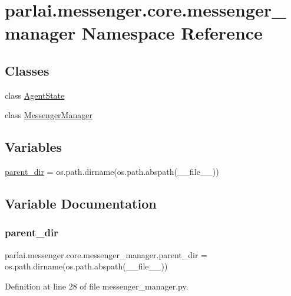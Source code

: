 \hypertarget{namespaceparlai_1_1messenger_1_1core_1_1messenger__manager}{}\section{parlai.\+messenger.\+core.\+messenger\+\_\+manager Namespace Reference}
\label{namespaceparlai_1_1messenger_1_1core_1_1messenger__manager}
\subsection*{Classes}
\begin{DoxyCompactItemize}
\item 
class \hyperlink{classparlai_1_1messenger_1_1core_1_1messenger__manager_1_1AgentState}{Agent\+State}
\item 
class \hyperlink{classparlai_1_1messenger_1_1core_1_1messenger__manager_1_1MessengerManager}{Messenger\+Manager}
\end{DoxyCompactItemize}
\subsection*{Variables}
\begin{DoxyCompactItemize}
\item 
\hyperlink{namespaceparlai_1_1messenger_1_1core_1_1messenger__manager_a7ceece35220edc906b6647392980d741}{parent\+\_\+dir} = os.\+path.\+dirname(os.\+path.\+abspath(\+\_\+\+\_\+file\+\_\+\+\_\+))
\end{DoxyCompactItemize}


\subsection{Variable Documentation}
\mbox{\label{namespaceparlai_1_1messenger_1_1core_1_1messenger__manager_a7ceece35220edc906b6647392980d741}} 
\subsubsection{\texorpdfstring{parent\+\_\+dir}{parent\_dir}}
{\footnotesize\ttfamily parlai.\+messenger.\+core.\+messenger\+\_\+manager.\+parent\+\_\+dir = os.\+path.\+dirname(os.\+path.\+abspath(\+\_\+\+\_\+file\+\_\+\+\_\+))}



Definition at line 28 of file messenger\+\_\+manager.\+py.

